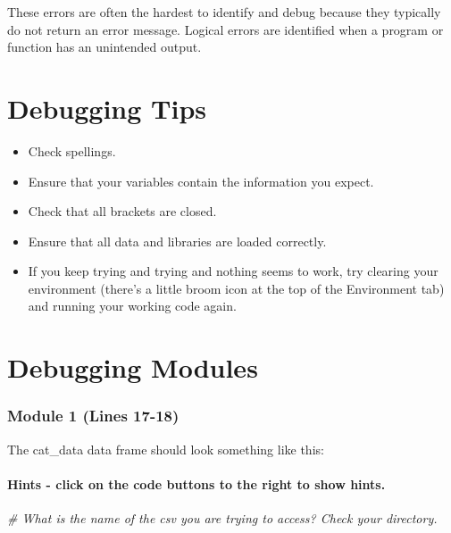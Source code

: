 \documentclass[
]{article}
\newenvironment{Shaded}{\begin{snugshade}}{\end{snugshade}}
\newcommand{\CommentTok}[1]{\textcolor[rgb]{0.56,0.35,0.01}{\textit{#1}}}
\providecommand{\tightlist}{%
  \setlength{\itemsep}{0pt}\setlength{\parskip}{0pt}}
\begin{document}
These errors are often the hardest to identify and debug because they
typically do not return an error message. Logical errors are identified
when a program or function has an unintended output.

\hypertarget{debugging-tips}{%
\section{Debugging Tips}\label{debugging-tips}}

\begin{itemize}
\tightlist
\item
  Check spellings.
\item
  Ensure that your variables contain the information you expect.
\item
  Check that all brackets are closed.
\item
  Ensure that all data and libraries are loaded correctly.
\item
  If you keep trying and trying and nothing seems to work, try clearing
  your environment (there's a little broom icon at the top of the
  Environment tab) and running your working code again.
\end{itemize}

\hypertarget{debugging-modules}{%
\section{Debugging Modules}\label{debugging-modules}}

\hypertarget{module-1-lines-17-18}{%
\subsubsection{Module 1 (Lines 17-18)}\label{module-1-lines-17-18}}

The cat\_data data frame should look something like this:

\hypertarget{hints---click-on-the-code-buttons-to-the-right-to-show-hints.}{%
\paragraph{Hints - click on the code buttons to the right to show
hints.}\label{hints---click-on-the-code-buttons-to-the-right-to-show-hints.}}

\begin{Shaded}
\begin{Highlighting}[]
\CommentTok{# What is the name of the csv you are trying to access? Check your directory.}
\end{Highlighting}
\end{Shaded}
\end{document}
